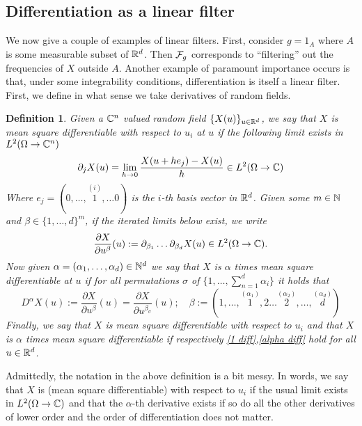 \documentclass[12pt]{article}
\newtheorem{definition}{Definition}
\begin{document}
\subsection{Differentiation as a linear filter}
We now give a couple of examples of linear filters. First, consider $g=1_A$ where  $A$ is some measurable subset of  ${\mathbb R}^d$. Then $\mathcal{F}_g$ corresponds to ``filtering'' out the frequencies of $X$ outside  $A$. Another example of paramount importance occurs is that, under some integrability conditions, differentiation is itself a linear filter. First, we define in what sense we take derivatives of random fields.
\begin{definition}
    Given a $\mathbb{C}^n$ valued random field $\{X(u)\}_{u\in{\mathbb R}^d}$, we say that \emph{$X$ is mean square differentiable with respect to $u_i$ at $u$} if the following limit exists in $L^2(\Omega\to\mathbb{C}^n)$
    \begin{equation}\label{1 diff}
        \partial_j X(u)=\lim_{h \to 0}\frac{X(u+he_j)-X(u)}{h}\in L^2(\Omega\to\mathbb{C})
    \end{equation}
    Where $e_j=(0,\ldots,\overset{(i)}{1},\ldots 0)$ is the $i$-th basis vector in  ${\mathbb R}^d$.
    Given some $m\in \mathbb{N}$ and $\beta\in\{1,\ldots,d\}^m$, if the iterated limits below exist, we write
    \begin{equation*}
        \frac{\partial X}{\partial u^\beta}(u):=\partial _{\beta_1}\ldots \partial _{\beta_d}X(u)\in L^2(\Omega\to\mathbb{C}) .
    \end{equation*}
    Now given $\alpha=(\alpha_1,\ldots,\alpha_d)\in \mathbb{N}^d$    we say that \emph{$X$ is  $\alpha$ times mean square differentiable at $u$} if for all permutations $\sigma$ of $\{1,\ldots,\sum_{n=1}^{d}\alpha_i\}$ it holds that
    \begin{equation}\label{alpha diff}
        D^\alpha X(u):=\frac{\partial X}{\partial u^\beta}(u)= \frac{\partial X}{\partial u^{\beta_\sigma}}(u);\quad \beta:=(1,\ldots,\overset{(\alpha_1)}{1},2\ldots \overset{(\alpha_2)}{2},\ldots,\overset{(\alpha_d)}{d})
    \end{equation}
    Finally, we say that \emph{$X$ is mean square differentiable with respect to $u_i$} and that \emph{ $X$ is $\alpha$ times mean square differentiable} if respectively \eqref{1 diff},\eqref{alpha diff}  hold for all $u\in {\mathbb R}^d$.
\end{definition}
Admittedly, the notation in the above definition is a bit messy. In words, we say that $X$ is (mean square differentiable) with respect to  $u_i$ if the usual limit exists in  $L^2(\Omega\to\mathbb{C})$ and that the $\alpha$-th derivative exists if so do all the other derivatives of lower order and the order of differentiation does not matter.\\
\end{document}
